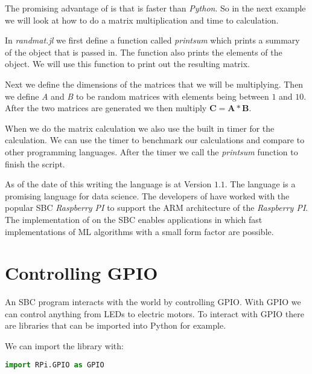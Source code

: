 	

The promising advantage of \emph{} is that \emph{} is faster than \emph{Python}. So in the next example we will look at how to do a matrix multiplication and time to calculation.

In \emph{randmat.jl} we first define a function called \emph{printsum} which prints a summary of the object that is passed in. The function also prints the elements of the object. We will use this function to print out the resulting matrix. 

Next we define the dimensions of the matrices that we will be multiplying. Then we define \emph{A} and \emph{B} to be random matrices with elements being between $1$ and $10$. After the two matrices are generated we then multiply $\mathbf{C}=\mathbf{A}*\mathbf{B}$. 

When we do the matrix calculation we also use the built in timer for the calculation. We can use the timer to benchmark our calculations and compare to other programming languages. After the timer we call the \emph{printsum} function to finish the script.

	
	
As of the date of this writing the \emph{} language is at Version $1.1$. The \emph{} language is a promising language for data science. The developers of \emph{} have worked with the popular \ac{SBC} \emph{Raspberry PI} to support the \ac{ARM} architecture of the \emph{Raspberry PI}. The implementation of \emph{} on the \ac{SBC} enables applications in which fast implementations of \ac{ML} algorithms with a small form factor are possible. 

\section{Controlling GPIO}

An \ac{SBC} program interacts with the world by controlling \ac{GPIO}. With \ac{GPIO} we can control anything from \ac{LED}s to electric motors. To interact with \ac{GPIO} there are libraries that can be imported into Python for example. 

We can import the   library with:

\begin{lstlisting}[language=python]
    import RPi.GPIO as GPIO
\end{lstlisting}

